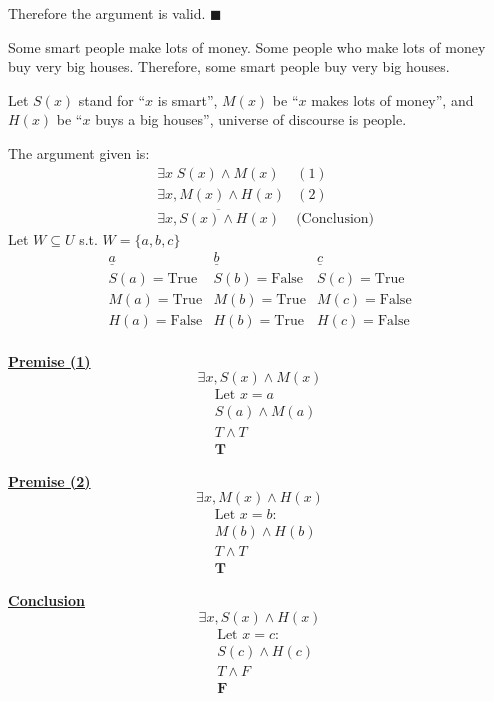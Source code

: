 \documentclass[]{article}
\begin{document}
\begin{center}
    Therefore the argument is valid. $\blacksquare$
\end{center}

\begin{question}{1.2}
  Some smart people make lots of money. Some people who make lots of money buy very big houses.
Therefore, some smart people buy very big houses.

Let $S(x)$ stand for “$x$ is smart”, $M(x)$ be “$x$ makes lots of money”, and $H(x)$ be “$x$ buys a big
houses”, universe of discourse is people.
\end{question}

The argument given is:
\begin{align*}
    & \exists x\; S(x) \land M(x) & (1)\\
    & \exists x, M(x) \land H(x) & (2)\\
    & \overline{\exists x, S(x) \land H(x)} & \text{(Conclusion)}
\end{align*}
\vspace{0.1in}
Let $W \subseteq U$ s.t. $W = \{a, b, c\}$
\[
\begin{array}{c|c|c}
    \underline{a} & \underline{b} & \underline{c} \\ \hline
    S(a) = \text{True} & S(b) = \text{False} & S(c) = \text{True} \\
    M(a) = \text{True} & M(b) = \text{True} & M(c) = \text{False} \\
    H(a) = \text{False} & H(b) = \text{True} & H(c) = \text{False} \\
\end{array}
\]

\underline{\textbf{Premise (1)}}  
\[
\exists x, S(x) \land M(x)
\]
\begin{align*}
    &\text{Let } x = a \\
    &S(a) \land M(a) \\
    &T \land T \\
    &\textbf{T}
\end{align*}


\underline{\textbf{Premise (2)}}  
\[
\exists x, M(x) \land H(x)
\]
\begin{align*}
    &\text{Let $x = b$:} \\
    &M(b) \land H(b) \\
    &T \land T \\
    &\textbf{T}
\end{align*}


\underline{\textbf{Conclusion}}  
\[
\exists x, S(x) \land H(x)
\]
\begin{align*}
    &\text{Let $x = c$:} \\
    &S(c) \land H(c) \\
    &T \land F \\
    &\textbf{F}
\end{align*}
\end{document}
